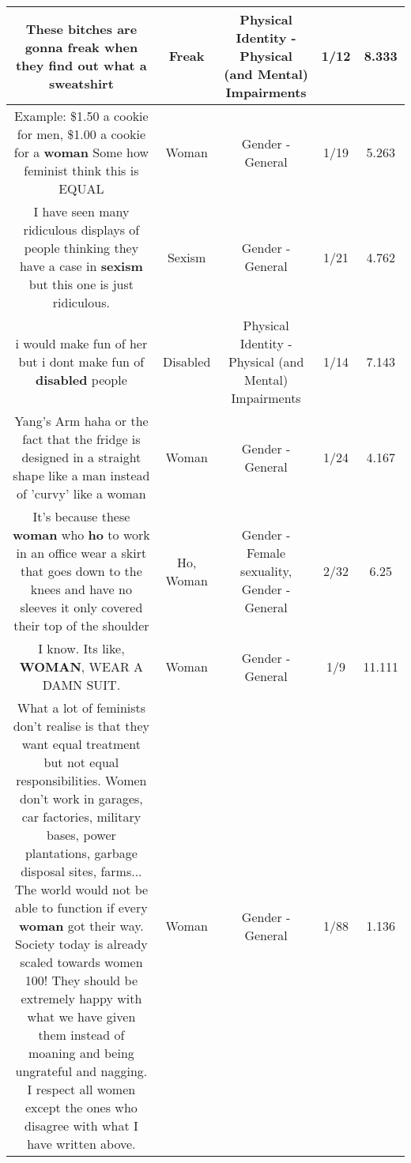 \documentclass[11pt]{article}
\newlength\mylength
\begin{document}
\begin{center}
\begin{longtable}{|C{.65\mylength}|C{.30\mylength}|C{.12\mylength}|C{.12\mylength}|C{.12\mylength}|}
  \small These bitches are gonna \textbf{freak} when they find out what a sweatshirt\normalsize   & Freak & Physical Identity - Physical (and Mental) Impairments & 1/12 & 8.333 \\  \hline
  \small Example: \$1.50 a cookie for men, \$1.00 a cookie for a \textbf{woman} Some how feminist think this is EQUAL\normalsize   & Woman & Gender - General & 1/19 & 5.263 \\  \hline
  \small I have seen many ridiculous displays of people thinking they have a case in \textbf{sexism} but this one is just ridiculous.\normalsize   & Sexism & Gender - General & 1/21 & 4.762 \\  \hline
  \small i would make fun of her but i dont make fun of \textbf{disabled} people\normalsize   & Disabled & Physical Identity - Physical (and Mental) Impairments & 1/14 & 7.143 \\  \hline
  \small Yang's Arm haha or the fact that the fridge is designed in a straight shape like a man instead of 'curvy' like a woman\normalsize   & Woman & Gender - General & 1/24 & 4.167 \\  \hline
  \small It's because these \textbf{woman} who \textbf{ho} to work in an office wear a skirt that goes down to the knees and have no sleeves it only covered their top of the shoulder\normalsize   & Ho, Woman & Gender - Female sexuality, Gender - General & 2/32 & 6.25 \\  \hline
  \small I know. Its like, \textbf{WOMAN}, WEAR A DAMN SUIT.\normalsize   & Woman & Gender - General & 1/9 & 11.111 \\  \hline
  \small What a lot of feminists don't realise is that they want equal treatment but not equal responsibilities. Women don't work in garages, car factories, military bases, power plantations, garbage disposal sites, farms... The world would not be able to function if every \textbf{woman} got their way. Society today is already scaled towards women 100! They should be extremely happy with what we have given them instead of moaning and being ungrateful and nagging. I respect all women except the ones who disagree with what I have written above.\normalsize   & Woman & Gender - General & 1/88 & 1.136 \\  \hline

\end{longtable}
\end{center}
\end{document}
